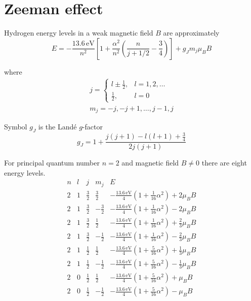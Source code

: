 

\section*{Zeeman effect}

Hydrogen energy levels in a weak magnetic field $B$ are approximately
\begin{equation*}
E=-\frac{13.6\,\text{eV}}{n^2}
\left[
1+\frac{\alpha^2}{n^2}\left(\frac{n}{j+1/2}-\frac{3}{4}\right)
\right]+g_Jm_j\mu_BB
\end{equation*}

where
\begin{gather*}
j=\begin{cases}
l\pm\frac{1}{2}, & l=1,2,\ldots
\\
\frac{1}{2}, & l=0
\end{cases}
\\[1ex]
m_j=-j,-j+1,\ldots,j-1,j
\end{gather*}

Symbol $g_J$ is the Land\'e $g$-factor
\begin{equation*}
g_J=1+\frac{j(j+1)-l(l+1)+\frac{3}{4}}{2j(j+1)}
\end{equation*}

For principal quantum number $n=2$ and magnetic field $B\ne0$ there are eight energy levels.
\begin{equation*}
\begin{matrix}
n & l & j & m_j & E
\\[2ex]
2 & 1 & \frac{3}{2} & \frac{3}{2} &
-\frac{13.6\,\text{eV}}{4}\left(1+\tfrac{1}{16}\alpha^2\right)+2\mu_BB
\\[2ex]
2 & 1 & \frac{3}{2} & -\frac{3}{2} &
-\frac{13.6\,\text{eV}}{4}\left(1+\tfrac{1}{16}\alpha^2\right)-2\mu_BB
\\[2ex]
2 & 1 & \frac{3}{2} & \frac{1}{2} &
-\frac{13.6\,\text{eV}}{4}\left(1+\tfrac{1}{16}\alpha^2\right)+\frac{2}{3}\mu_BB
\\[2ex]
2 & 1 & \frac{3}{2} & -\frac{1}{2} &
-\frac{13.6\,\text{eV}}{4}\left(1+\tfrac{1}{16}\alpha^2\right)-\frac{2}{3}\mu_BB
\\[2ex]
2 & 1 & \frac{1}{2} & \frac{1}{2} &
-\frac{13.6\,\text{eV}}{4}\left(1+\tfrac{5}{16}\alpha^2\right)+\frac{1}{3}\mu_BB
\\[2ex]
2 & 1 & \frac{1}{2} & -\frac{1}{2} &
-\frac{13.6\,\text{eV}}{4}\left(1+\tfrac{5}{16}\alpha^2\right)-\frac{1}{3}\mu_BB
\\[2ex]
2 & 0 & \frac{1}{2} & \frac{1}{2} &
-\frac{13.6\,\text{eV}}{4}\left(1+\tfrac{5}{16}\alpha^2\right)+\mu_BB
\\[2ex]
2 & 0 & \frac{1}{2} & -\frac{1}{2} &
-\frac{13.6\,\text{eV}}{4}\left(1+\tfrac{5}{16}\alpha^2\right)-\mu_BB
\end{matrix}
\end{equation*}


